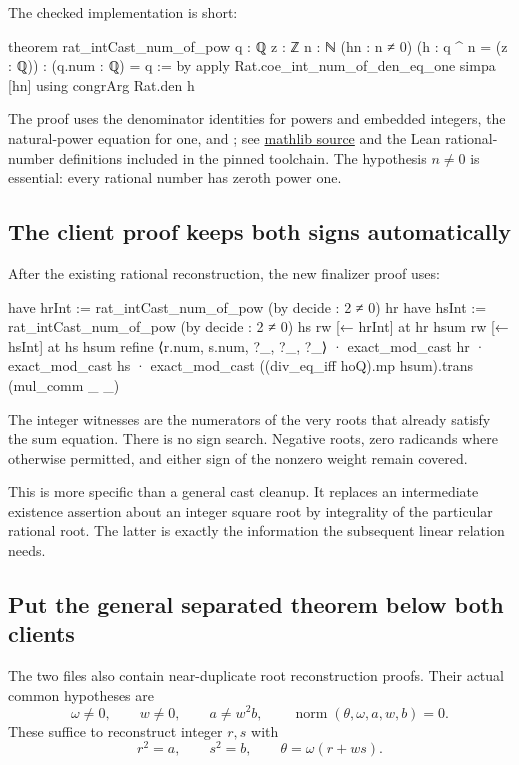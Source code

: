 \documentclass[11pt,letterpaper]{article}
\newcommand{\code}[1]{\texttt{\detokenize{#1}}}
\newcommand{\ml}[1]{\href{https://github.com/leanprover-community/mathlib4/blob/81a5d257c8e410db227a6665ed08f64fea08e997/Mathlib/#1.lean}{mathlib source}}
\begin{document}
The checked implementation is short:
\begin{Lean}
theorem rat_intCast_num_of_pow {q : ℚ} {z : ℤ} {n : ℕ}
    (hn : n ≠ 0) (h : q ^ n = (z : ℚ)) :
    (q.num : ℚ) = q := by
  apply Rat.coe_int_num_of_den_eq_one
  simpa [hn] using congrArg Rat.den h
\end{Lean}

The proof uses the denominator identities for powers and embedded integers,
the natural-power equation for one, and
\code{Rat.coe_int_num_of_den_eq_one}; see
\ml{Data/Rat/Defs} and the Lean rational-number definitions included in the
pinned toolchain. The hypothesis \(n\ne0\) is essential: every rational number
has zeroth power one.

\subsection{The client proof keeps both signs automatically}

After the existing rational reconstruction, the new finalizer proof uses:
\begin{Lean}
have hrInt := rat_intCast_num_of_pow (by decide : 2 ≠ 0) hr
have hsInt := rat_intCast_num_of_pow (by decide : 2 ≠ 0) hs
rw [← hrInt] at hr hsum
rw [← hsInt] at hs hsum
refine ⟨r.num, s.num, ?_, ?_, ?_⟩
· exact_mod_cast hr
· exact_mod_cast hs
· exact_mod_cast
    ((div_eq_iff hoQ).mp hsum).trans (mul_comm _ _)
\end{Lean}

The integer witnesses are the numerators of the very roots that already
satisfy the sum equation. There is no sign search. Negative roots, zero
radicands where otherwise permitted, and either sign of the nonzero weight
remain covered.

This is more specific than a general cast cleanup. It replaces an intermediate
existence assertion about an integer square root by integrality of the
particular rational root. The latter is exactly the information the subsequent
linear relation needs.

\subsection{Put the general separated theorem below both clients}

The two files also contain near-duplicate root reconstruction proofs.
Their actual common hypotheses are
\[
 \omega\ne0,\qquad w\ne0,\qquad a\ne w^2b,
 \qquad \operatorname{norm}(\theta,\omega,a,w,b)=0.
\]
These suffice to reconstruct integer \(r,s\) with
\[
 r^2=a,\qquad s^2=b,\qquad \theta=\omega(r+ws).
\]
\end{document}
